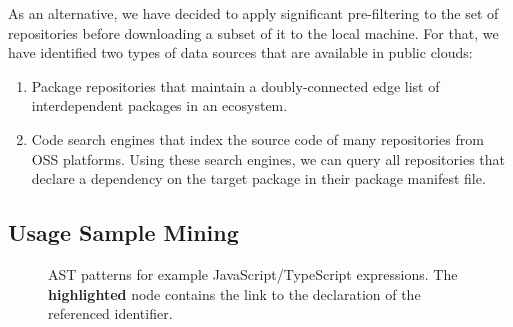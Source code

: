 As an alternative, we have decided to apply significant pre-filtering to the set of repositories before downloading a subset of it to the local machine.
For that, we have identified two types of data sources that are available in public clouds:

\begin{enumerate}[label=(\roman*)]
	\item Package repositories that maintain a doubly-connected edge list of interdependent packages in an ecosystem.
	\item Code search engines that index the source code of many repositories from OSS platforms.
		Using these search engines, we can query all repositories that declare a dependency on the target package in their package manifest file.
\end{enumerate}

\subsection{Usage Sample Mining}
\label{sec:approach/usage_mining}

\begin{figure*}
	\begin{minipage}{\linewidth}
		\newcommand\textlowlight[1]{\textcolor{lowlight}{#1}}
		\newcommand\texthighlight[1]{\textbf{\textcolor{accent1}{#1}}}
		\begin{center}
			\begin{subfigure}[t]{.32\linewidth}
				
			\end{subfigure}
			\hfill
			\begin{subfigure}[t]{.32\linewidth}
				
			\end{subfigure}
			\hfill
			\begin{subfigure}[t]{.32\linewidth}
				
			\end{subfigure}

			\caption{AST patterns for example JavaScript/TypeScript expressions.
				The \texthighlight{highlighted} node contains the link to the declaration of the referenced identifier.
			}
			\label{fig:approach/usage_mining/patterns}
		\end{center}
	\end{minipage}
\end{figure*}

